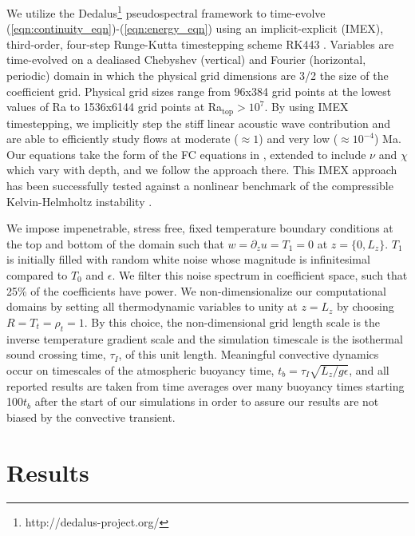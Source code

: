 \documentclass[aps, prl, twocolumn, nofootinbib, groupedaddress, amsfonts, amssymb, amsmath]{revtex4-1}
\begin{document}
We utilize the 
Dedalus\footnote{http://dedalus-project.org/} \cite{burns&all2016} pseudospectral framework 
 to time-evolve  
(\ref{eqn:continuity_eqn})-(\ref{eqn:energy_eqn}) 
using an implicit-explicit (IMEX), third-order, four-step 
Runge-Kutta timestepping scheme RK443 \cite{ascher&all1997}.  
Variables are time-evolved on a dealiased Chebyshev (vertical)
and Fourier (horizontal, periodic) domain in which the
physical grid dimensions are 3/2 the size of the coefficient grid.  
Physical grid sizes range from
96x384 grid points at the lowest values of 
Ra to 1536x6144 grid points at Ra$_{\text{top}} > 10^{7}$. 
By using IMEX timestepping, we implicitly step the 
stiff linear acoustic wave contribution and are able to
efficiently study flows at moderate ($\approx 1$) and very low ($\approx 10^{-4}$)
Ma.  Our equations take the form
of the FC equations in \cite{lecoanet&all2014}, extended to include
$\nu$ and $\chi$ which vary with depth, and we follow the approach there.
This IMEX approach has been successfully 
tested against a nonlinear benchmark  of the compressible 
Kelvin-Helmholtz instability \cite{Lecoanet_et_al_2016_KH}.

We impose
impenetrable, stress free, fixed temperature boundary conditions at
the top and bottom of the domain such that 
$w = \partial_z u = T_1 = 0$ at $z = \{0, L_z\}$. 
$T_1$ is initially filled with
random white noise whose magnitude is infinitesimal
compared to $T_0$ and $\epsilon$.
We filter this noise spectrum in coefficient space, such that 25\% of the coefficients
have power. We non-dimensionalize our computational domains by setting
all thermodynamic variables to unity at $z = L_z$ by choosing
$R = T_t = \rho_t = 1$.  By this choice, the non-dimensional
grid length scale is the inverse temperature gradient scale and the 
simulation timescale is the isothermal sound crossing time, $\tau_I$, of this unit length.
Meaningful convective dynamics occur on timescales of the atmospheric buoyancy time,
$t_b = \tau_I \sqrt{L_z/g\epsilon}$, and all reported results are taken from time averages
over many buoyancy times starting 100$t_b$ after the start of our simulations in order to
assure our results are not biased by the convective transient.

\section{Results}
\label{sec:results}
\end{document}
